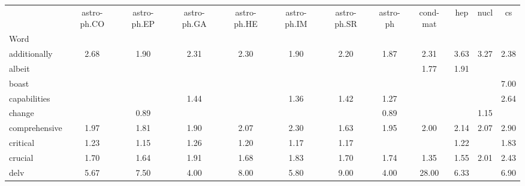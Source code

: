 \begin{tabular}{|l|c|c|c|c|c|c|c|c|c|c|c|}
\toprule
 & astro-ph.CO & astro-ph.EP & astro-ph.GA & astro-ph.HE & astro-ph.IM & astro-ph.SR & astro-ph & cond-mat & hep & nucl & cs \\
Word &  &  &  &  &  &  &  &  &  &  &  \\
\midrule
additionally & \cellcolor{yellow!53} 2.68 & \cellcolor{yellow!38} 1.90 & \cellcolor{yellow!46} 2.31 & \cellcolor{yellow!46} 2.30 & \cellcolor{yellow!38} 1.90 & \cellcolor{yellow!44} 2.20 & \cellcolor{yellow!37} 1.87 & \cellcolor{yellow!46} 2.31 & \cellcolor{yellow!72} 3.63 & \cellcolor{yellow!65} 3.27 & \cellcolor{yellow!47} 2.38 \\
albeit &  &  &  &  &  &  &  & \cellcolor{yellow!35} 1.77 & \cellcolor{yellow!38} 1.91 &  &  \\
boast &  &  &  &  &  &  &  &  &  &  & \cellcolor{yellow!100} 7.00 \\
capabilities &  &  & \cellcolor{yellow!28} 1.44 &  & \cellcolor{yellow!27} 1.36 & \cellcolor{yellow!28} 1.42 & \cellcolor{yellow!25} 1.27 &  &  &  & \cellcolor{yellow!52} 2.64 \\
change &  & \cellcolor{yellow!17} 0.89 &  &  &  &  & \cellcolor{yellow!17} 0.89 &  &  & \cellcolor{yellow!23} 1.15 &  \\
comprehensive & \cellcolor{yellow!39} 1.97 & \cellcolor{yellow!36} 1.81 & \cellcolor{yellow!38} 1.90 & \cellcolor{yellow!41} 2.07 & \cellcolor{yellow!46} 2.30 & \cellcolor{yellow!32} 1.63 & \cellcolor{yellow!39} 1.95 & \cellcolor{yellow!40} 2.00 & \cellcolor{yellow!42} 2.14 & \cellcolor{yellow!41} 2.07 & \cellcolor{yellow!57} 2.90 \\
critical & \cellcolor{yellow!24} 1.23 & \cellcolor{yellow!23} 1.15 & \cellcolor{yellow!25} 1.26 & \cellcolor{yellow!24} 1.20 & \cellcolor{yellow!23} 1.17 & \cellcolor{yellow!23} 1.17 &  &  & \cellcolor{yellow!24} 1.22 &  & \cellcolor{yellow!36} 1.83 \\
crucial & \cellcolor{yellow!34} 1.70 & \cellcolor{yellow!32} 1.64 & \cellcolor{yellow!38} 1.91 & \cellcolor{yellow!33} 1.68 & \cellcolor{yellow!36} 1.83 & \cellcolor{yellow!34} 1.70 & \cellcolor{yellow!34} 1.74 & \cellcolor{yellow!27} 1.35 & \cellcolor{yellow!31} 1.55 & \cellcolor{yellow!40} 2.01 & \cellcolor{yellow!48} 2.43 \\
delv & \cellcolor{yellow!100} 5.67 & \cellcolor{yellow!100} 7.50 & \cellcolor{yellow!80} 4.00 & \cellcolor{yellow!100} 8.00 & \cellcolor{yellow!100} 5.80 & \cellcolor{yellow!100} 9.00 & \cellcolor{yellow!80} 4.00 & \cellcolor{yellow!100} 28.00 & \cellcolor{yellow!100} 6.33 &  & \cellcolor{yellow!100} 6.90 \\

\end{tabular}
